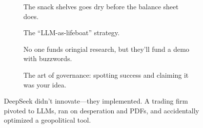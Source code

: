 \begin{figure}[H]
  \centering

  \begin{subfigure}[t]{0.45\textwidth}
  \centering
  \caption*{The snack shelves goes dry before the balance sheet does.}
  \end{subfigure}
  \hfill
  \begin{subfigure}[t]{0.45\textwidth}
  \centering
  \caption*{The “LLM-as-lifeboat” strategy.}
  \end{subfigure}

  \vspace{1em}

  \begin{subfigure}[t]{0.45\textwidth}
  \centering
  \caption*{No one funds oringial research, but they'll fund a demo with buzzwords.}
  \end{subfigure}
  \hfill
  \begin{subfigure}[t]{0.45\textwidth}
  \centering
  \caption*{The art of governance: spotting success and claiming it was your idea.}
  \end{subfigure}

  \caption{DeepSeek didn’t innovate—they implemented. A trading firm pivoted to LLMs, ran on desperation and PDFs, and accidentally optimized a geopolitical tool.}
\end{figure}





